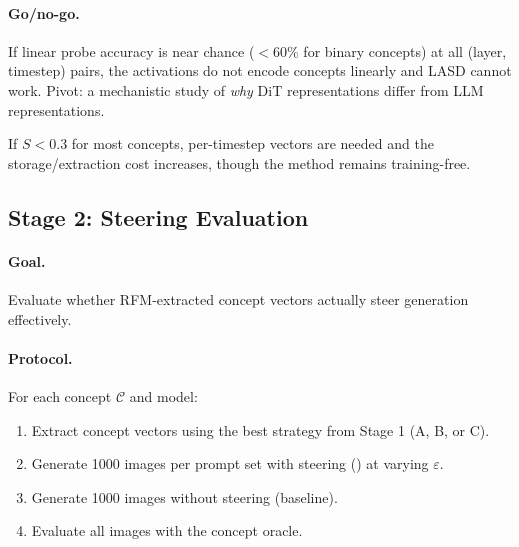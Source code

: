 \documentclass[11pt]{article}
\begin{document}
\paragraph{Go/no-go.}
If linear probe accuracy is near chance ($<$60\% for binary concepts) at all (layer, timestep) pairs, the activations do not encode concepts linearly and LASD cannot work.
Pivot: a mechanistic study of \emph{why} DiT representations differ from LLM representations.

If $S < 0.3$ for most concepts, per-timestep vectors are needed and the storage/extraction cost increases, though the method remains training-free.

\subsection{Stage 2: Steering Evaluation}
\label{sec:exp_stage2}

\paragraph{Goal.} Evaluate whether RFM-extracted concept vectors actually steer generation effectively.

\paragraph{Protocol.}
For each concept $\mathcal{C}$ and model:
\begin{enumerate}[leftmargin=*]
    \item Extract concept vectors using the best strategy from Stage 1 (A, B, or C).
    \item Generate 1000 images per prompt set with steering () at varying $\varepsilon$.
    \item Generate 1000 images without steering (baseline).
    \item Evaluate all images with the concept oracle.
\end{enumerate}
\end{document}

